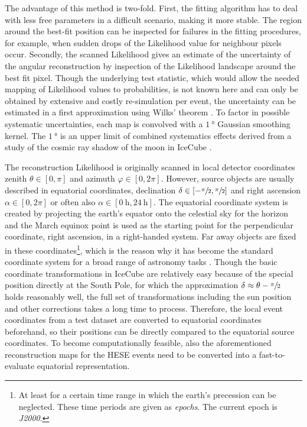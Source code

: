 The advantage of this method is two-fold.
First, the fitting algorithm has to deal with less free parameters in a difficult scenario, making it more stable.
The region around the best-fit position can be inspected for failures in the fitting procedures, for example, when sudden drops of the Likelihood value for neighbour pixels occur.
Secondly, the scanned Likelihood gives an estimate of the uncertainty of the angular reconstruction by inspection of the Likelihood landscape around the best fit pixel.
Though the underlying test statistic, which would allow the needed mapping of Likelihood values to probabilities, is not known here and can only be obtained by extensive and costly re-simulation per event, the uncertainty can be estimated in a first approximation using Wilks' theorem \cite{Wilks:1938dza,casella2002statistical,bohm2010introduction}.
To factor in possible systematic uncertainties, each map is convolved with a $\SI{1}{\degree}$ Gaussian smoothing kernel.
The $\SI{1}{\degree}$ is an upper limit of combined systematics effects derived from a study of the cosmic ray shadow of the moon in IceCube \cite{Aartsen:2013jdh,Aartsen:2013zka}.

The reconstruction Likelihood is originally scanned in local detector coordinates zenith $\theta\in[0, \pi]$ and azimuth $\varphi\in[0, 2\pi]$.
However, source objects are usually described in equatorial coordinates, declination $\delta\in[-\sfrac{\pi}{2}, \sfrac{\pi}{2}]$ and right ascension $\alpha\in[0, 2\pi]$ or often also $\alpha\in[\SI{0}{\hour}, \SI{24}{\hour}]$.
The equatorial coordinate system is created by projecting the earth's equator onto the celestial sky for the horizon and the March equinox point is used as the starting point for the perpendicular coordinate, right ascension, in a right-handed system.
Far away objects are fixed in these coordinates\footnote{At least for a certain time range in which the earth's precession can be neglected. These time periods are given as \emph{epochs}. The current epoch is \emph{J2000}.}, which is the reason why it has become the standard coordinate system for a broad range of astronomy tasks \cite{Hohenkerk:1992AstroAlmanac}.
Though the basic coordinate transformations in IceCube are relatively easy because of the special position directly at the South Pole, for which the approximation $\delta \approx \theta - \sfrac{\pi}{2}$ holds reasonably well, the full set of transformations including the sun position and other corrections takes a long time to process.
Therefore, the local event coordinates from a test dataset are converted to equatorial coordinates beforehand, so their positions can be directly compared to the equatorial source coordinates.
To become computationally feasible, also the aforementioned reconstruction maps for the HESE events need to be converted into a fast-to-evaluate equatorial representation.


